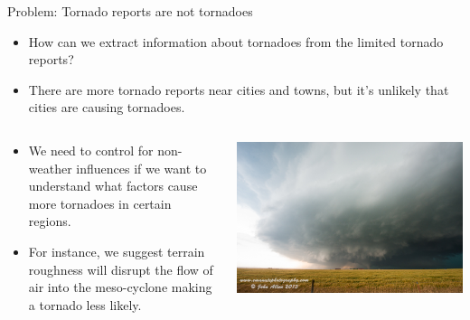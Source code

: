 \documentclass[handout]{beamer}
\begin{document}
\begin{frame}{Problem: Tornado reports are not tornadoes}
\begin{itemize}
\item How can we extract information about tornadoes from the limited tornado reports?
\item There are more tornado reports near cities and towns, but it's unlikely that cities are causing tornadoes.
\end{itemize}
\begin{columns}
\begin{column}{6cm}
\begin{itemize}
\item We need to control for non-weather influences if we want to understand what factors cause more tornadoes in certain regions.
\item For instance, we suggest terrain roughness will disrupt the flow of air into the meso-cyclone making a tornado less likely.
\end{itemize}
\end{column}
\begin{column}{4cm}
\begin{center}
\includegraphics[scale = .32]{figures/TornMeso.jpg}
\end{center}
\end{column}
\end{columns}
\end{frame}
\end{document}
